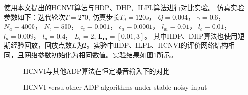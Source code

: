 使用本文提出的HCNVI算法与HDP、DHP、ILPL算法进行对比实验。
仿真实验参数如下：迭代轮次$T=270$, 仿真步长$T_d=120s$， $Q=0.004$，
$\gamma=0.6$， $N_a=4000$， $N_c=500$， $\epsilon _c=0.001$，
$\epsilon _a=0.0001$， $l_m=0.01$， $l_c=0.01$， $l_a=0.009$，
$l_u=0.4$， $L_c=2$, $\pmb {L_m}=[0.01,3]$。
其中HDP、DHP算法也使用短期经验回放，回放点数$L$为2。实验中HDP、ILPL、HCNVI的评价网络结构相同，且网络参数初始化为相同数值。实验结果如图\ref{fig:HCNVI_HDP}所示。
\begin{figure}[!ht]
\centering \subfigure{\label{fig:concentraion_out_exp1}}
\addtocounter{subfigure}{-2}  \centering
 \subfigure{\label{fig:cost_exp1}}
\addtocounter{subfigure}{-2} 


    \caption{HCNVI与其他ADP算法在恒定噪音输入下的对比}

  \addtocounter{figure}{-1}
  \vspace{-5pt}
  \renewcommand{\figurename}{Fig.}
  \caption{HCNVI versu other ADP algorithms under stable noisy input}
  \renewcommand{\figurename}{图}

    \label{fig:HCNVI_HDP}
\end{figure}


